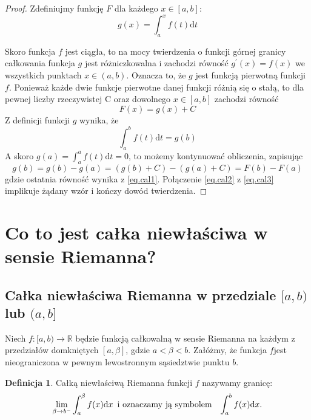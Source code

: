 \documentclass{article}
\numberwithin{equation}{section}
\theoremstyle{definition}
\newtheorem{definition}{Definicja}[section]
\theoremstyle{case}
\begin{document}
\begin{proof}
	Zdefiniujmy funkcję $F$ dla każdego ${x \in [a,b]}$:
	\begin{equation*}
		g(x) = \textstyle \int_a^x f(t) \mathrm{d}t
	\end{equation*}

	Skoro funkcja $f$ jest ciągła, to na mocy twierdzenia o funkcji
	górnej granicy całkowania funkcja $g$ jest różniczkowalna
	i zachodzi równość ${g^\prime(x)=f(x)}$ we wszystkich punktach ${x \in (a,b)}$.
	Oznacza to, że $g$ jest funkcją pierwotną funkcji $f$.
	Ponieważ każde dwie funkcje pierwotne danej funkcji różnią się o stałą,
	to dla pewnej liczby rzeczywistej C oraz dowolnego ${x \in [a,b]}$
	zachodzi równość
	\begin{equation}
		\label{eq.cal1}
		F(x)=g(x)+C
	\end{equation}
	Z definicji funkcji $g$ wynika, że
	\begin{equation}
		\label{eq.cal2}
		\textstyle \int_a^b f(t) \mathrm{d}t = g(b)
	\end{equation}
	A skoro $g(a) = \textstyle \int_a^a f(t) \mathrm{d}t=0$,
	to możemy kontynuować obliczenia, zapisując
	\begin{equation}
		\label{eq.cal3}
		g(b)=g(b)-g(a)=(g(b)+C)-(g(a)+C)=F(b)-F(a)
	\end{equation}
	gdzie ostatnia równość wynika z \eqref{eq.cal1}. Połączenie \eqref{eq.cal2} z \eqref{eq.cal3} implikuje żądany wzór i kończy dowód twierdzenia.
\end{proof}

\section{Co to jest całka niewłaściwa w sensie Riemanna?}
\subsection{Całka niewłaściwa Riemanna w przedziale $[a,b)$ lub $(a,b]$}
Niech ${f \colon [a,b) \to \mathbb{R}}$ będzie funkcją całkowalną w sensie Riemanna
	na każdym z przedziałów domkniętych ${[a,\beta]}$,
	gdzie $a < \beta < b$.
	Załóżmy, że funkcja $f$jest nieograniczona w pewnym lewostronnym sąsiedztwie punktu $b$.
	\begin{definition}
		\label{def.1}
		Całką niewłaściwą Riemanna funkcji $f$ nazywamy granicę:
		\begin{equation*}
			\lim_{\beta \to b^-} \int _a ^{\beta} f(x) \mathrm{d}x
			\textnormal{\enskip i oznaczamy ją symbolem \enskip}
			\int_a^b f(x) \mathrm{d}x
			\textnormal{.}
		\end{equation*}
	\end{definition}
\end{document}
